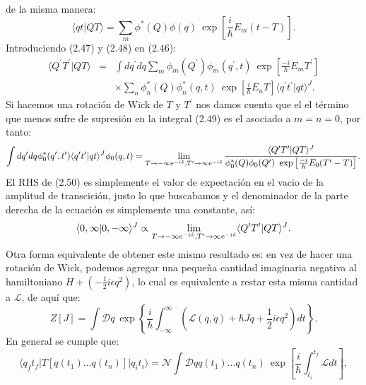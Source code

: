de la misma manera:
\begin{equation}
\langle qt|	QT  \rangle=\sum_{m}\phi^{*}(Q)\phi(q)\ \exp\left[\frac{i}{\hbar}E_{m}(t-T)\right].
\end{equation}
Introduciendo (2.47) y (2.48) en (2.46):
\begin{eqnarray}
\nonumber \langle Q^{\prime} T^{\prime}|QT\rangle &=&\int dq^{\prime} dq\sum_{m}\phi_{m}(Q^{\prime})\phi_{m}(q^{\prime},t)\ \exp\left[\frac{-i}{\hbar}E_{m}T^{\prime}\right]\\
&&\times  \sum_{n}\phi_{n}^{*}(Q)\phi_{n}^{*}(q,t)\ \exp\left[\frac{i}{\hbar}E_{n}T\right]\langle q^{\prime} t^{\prime}|qt\rangle^{J}.
\end{eqnarray}
Si hacemos una rotación de Wick de $T$ y $T^{\prime} $ nos damos cuenta que el el término que menos sufre de supresión en la integral (2.49) es el asociado a $m=n=0$, por tanto:
\begin{equation}
\int dq^{\prime} dq\phi_{0}^{*}(q^{\prime},t^{\prime})\langle q^{\prime} t^{\prime}|qt\rangle^{J}\phi_{0}(q,t)=\lim_{T\to-\text{\ensuremath{\infty}e}^{-i\delta},T^{\prime}\to\text{\ensuremath{\infty}e}^{-i\delta}}\frac{\langle Q^{\prime} T^{\prime}|QT\rangle^{J}}{\phi_{0}^{*}(Q)\phi_{0}(Q^{\prime})\ \exp\left[\frac{-i}{\hbar}E_{0}(T^{\prime}-T)\right]}.
\end{equation}
El RHS de (2.50) es simplemente el valor de expectación en el vacio de la amplitud de transcición, justo lo que buscabamos y el denominador de la parte derecha de la ecuación es simplemente una constante, así:
\begin{equation}
\langle 0,\infty| 0,-\infty \rangle ^J \propto \lim_{T\to-\text{\ensuremath{\infty}e}^{-i\delta},T^{\prime}\to\text{\ensuremath{\infty}e}^{-i\delta}}\langle Q^{\prime} T^{\prime}|QT\rangle^{J}.
\end{equation}
Otra forma equivalente de obtener este mismo resultado es: en vez de hacer una rotación de Wick, podemos agregar una pequeña cantidad imaginaria negativa al hamiltoniano $H+(-\frac{1}{2}i\epsilon q^2)$, lo cual es equivalente a restar esta misma cantidad a $\mathcal{L}$, de aquí que:
\begin{equation}
Z[J]=\int\mathcal{D}q\ \exp\left\{ \frac{i}{\hbar}\int_{-\infty}^{\infty}(\mathcal{L}(q,\dot{q})+\hbar Jq + \frac{1}{2}i\epsilon q^2)dt\right\} .
\end{equation}
En general se cumple que:
\begin{equation}
 \langle q_{f}t_{f}|T[q(t_{1})...q(t_{n})]|q_{i}t_{i}\rangle=\mathcal{N}\int\mathcal{D}qq(t_{1})...q(t_{n})\ \exp\left[\frac{i}{\hbar}\int_{t_{i}}^{t_{f}}\mathcal{L}dt\right],
\end{equation}
